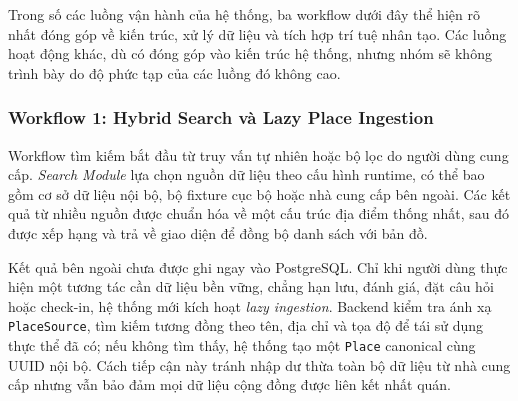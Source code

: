 \documentclass[12pt, a4paper]{article}
\begin{document}
Trong số các luồng vận hành của hệ thống, ba workflow dưới đây thể hiện rõ nhất đóng góp về kiến trúc, xử lý dữ liệu và tích hợp trí tuệ nhân tạo. Các luồng hoạt động khác, dù có đóng góp vào kiến trúc hệ thống, nhưng nhóm sẽ không trình bày do độ phức tạp của các luồng đó không cao.

\subsubsection*{Workflow 1: Hybrid Search và Lazy Place Ingestion}

Workflow tìm kiếm bắt đầu từ truy vấn tự nhiên hoặc bộ lọc do người dùng cung cấp. \textit{Search Module} lựa chọn nguồn dữ liệu theo cấu hình runtime, có thể bao gồm cơ sở dữ liệu nội bộ, bộ fixture cục bộ hoặc nhà cung cấp bên ngoài. Các kết quả từ nhiều nguồn được chuẩn hóa về một cấu trúc địa điểm thống nhất, sau đó được xếp hạng và trả về giao diện để đồng bộ danh sách với bản đồ.

Kết quả bên ngoài chưa được ghi ngay vào PostgreSQL. Chỉ khi người dùng thực hiện một tương tác cần dữ liệu bền vững, chẳng hạn lưu, đánh giá, đặt câu hỏi hoặc check-in, hệ thống mới kích hoạt \textit{lazy ingestion}. Backend kiểm tra ánh xạ \texttt{PlaceSource}, tìm kiếm tương đồng theo tên, địa chỉ và tọa độ để tái sử dụng thực thể đã có; nếu không tìm thấy, hệ thống tạo một \texttt{Place} canonical cùng UUID nội bộ. Cách tiếp cận này tránh nhập dư thừa toàn bộ dữ liệu từ nhà cung cấp nhưng vẫn bảo đảm mọi dữ liệu cộng đồng được liên kết nhất quán.
\end{document}
